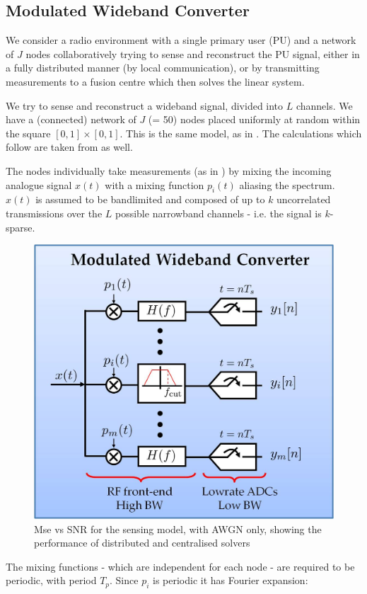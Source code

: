 \documentclass{article}
\begin{document}
\subsection{Modulated Wideband Converter}
We consider a radio environment with a single primary user (PU) and a network of \(J\) nodes collaboratively trying to sense and reconstruct the PU signal, either in a fully distributed manner (by local communication), or by transmitting measurements to a fusion centre which then solves the linear system. 

We try to sense and reconstruct a wideband signal, divided into \(L\) channels. We have a (connected) network of \(J\) (= 50) nodes placed uniformly at random within the square \(  \left[0,1\right]\times \left[0,1\right] \). This is the same model, as in \cite{Zhang2011b}. The calculations which follow are taken from \cite{Zhang2011b} as well.

The nodes individually take measurements (as in \cite{mishali2010theory}) by mixing the incoming analogue signal \(x\left(t\right)\) with a mixing function \(p_i\left(t\right)\) aliasing the spectrum. \(x\left(t\right)\) is assumed to be bandlimited and composed of up to \(k\) uncorrelated transmissions over the \(L\) possible narrowband channels - i.e. the signal is \(k\)-sparse. 

\begin{figure}[h]
\centering
\includegraphics[height = 7.3 cm]{Modulated_wideband_converter.jpg}
\caption{Mse vs SNR for the sensing model, with AWGN only, showing the performance of distributed and centralised solvers}
\label{msevssnr0}
\end{figure}

The mixing functions - which are independent for each node - are required to be periodic, with period \(T_p\). Since \(p_i\) is periodic it has Fourier expansion:
\end{document}
